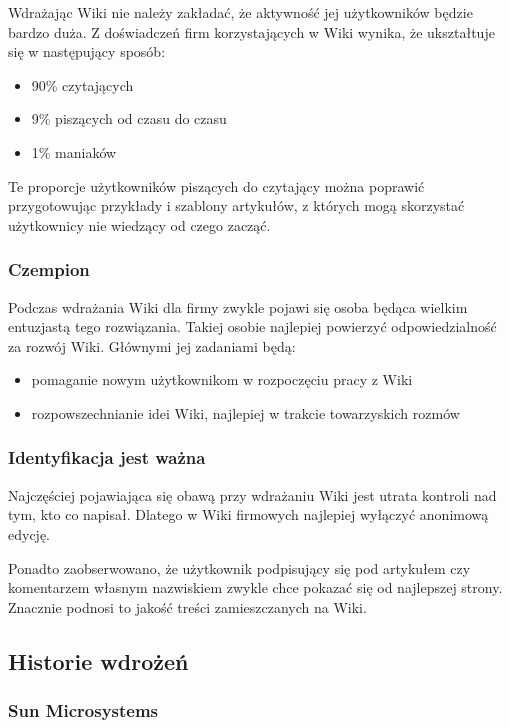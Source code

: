 \documentclass{article}
\begin{document}
Wdrażając Wiki nie należy zakładać, że aktywność jej użytkowników będzie bardzo duża. Z doświadczeń firm korzystających w Wiki wynika, że ukształtuje się w następujący sposób: 
		\begin{itemize}
			\item 90\% czytających
			\item 9\% piszących od czasu do czasu
			\item 1\% maniaków
		\end{itemize}
Te proporcje użytkowników piszących do czytający można poprawić przygotowując przykłady i szablony artykułów, z których mogą skorzystać użytkownicy nie wiedzący od czego zacząć.

\subsubsection{Czempion}

Podczas wdrażania Wiki dla firmy zwykle pojawi się osoba będąca wielkim entuzjastą tego rozwiązania. Takiej osobie najlepiej powierzyć odpowiedzialność za rozwój Wiki. Głównymi jej zadaniami będą:
		\begin{itemize}
			\item pomaganie nowym użytkownikom w rozpoczęciu pracy z Wiki
		\item rozpowszechnianie idei Wiki, najlepiej w trakcie towarzyskich rozmów
		\end{itemize}

\subsubsection{Identyfikacja jest ważna}

Najczęściej pojawiająca się obawą przy wdrażaniu Wiki jest utrata kontroli nad tym, kto co napisał. Dlatego w Wiki firmowych najlepiej wyłączyć anonimową edycję.

Ponadto zaobserwowano, że użytkownik podpisujący się pod artykułem czy komentarzem własnym nazwiskiem zwykle chce pokazać się od najlepszej strony. Znacznie podnosi to jakość treści zamieszczanych na Wiki.

	\subsection{Historie wdrożeń} %

\subsubsection{Sun Microsystems} %
\end{document}
